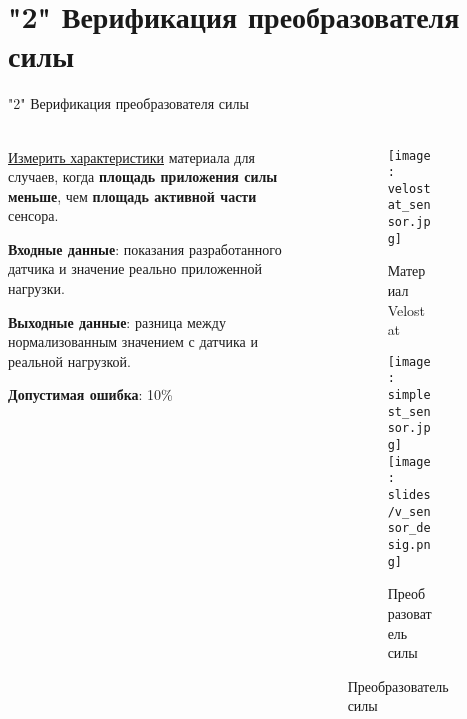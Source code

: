 \section{"2" Верификация преобразователя силы}

\begin{frame}[t]{"2" Верификация преобразователя силы}
    \framesubtitle{}
    \begin{columns}[T,onlytextwidth]
        \begin{column}{0.59\textwidth}
            \underline{Измерить характеристики} материала для случаев, когда \textbf{площадь приложения силы меньше}, чем \textbf{площадь активной части} сенсора.

            \textbf{Входные данные}: показания разработанного датчика и значение реально приложенной нагрузки.

            \textbf{Выходные данные}: разница между нормализованным значением с датчика и реальной нагрузкой.
        
            \textbf{Допустимая ошибка}: 10\%

        \end{column}
        \begin{column}{0.39\textwidth}
            \vspace{-0.6cm}
            \begin{figure}[H]
                \begin{subfigure}{0.9\textwidth}
                    \centering\texttt{[image: velostat\_sensor.jpg]}
                    \caption*{Материал Velostat}
                \end{subfigure}

                \begin{subfigure}{0.9\textwidth}
                    \centering\texttt{[image: simplest\_sensor.jpg]}
                    \centering\texttt{[image: slides/v\_sensor\_desig.png]}
                    \caption*{Преобразователь силы}
                \end{subfigure}
            \end{figure}
        \end{column}
    \end{columns}
\end{frame}

